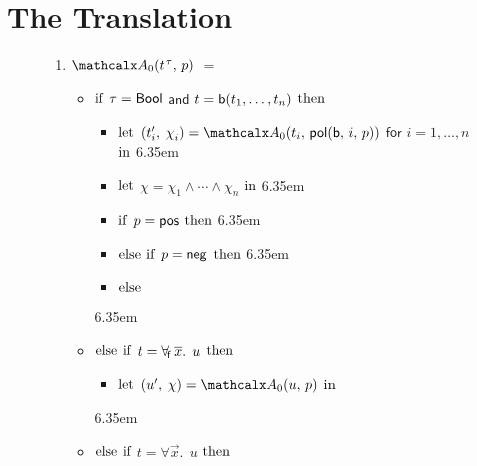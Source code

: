 
\section{The Translation}
\label{sec:encoding}

\newcommand{\itemx}{\itemindent6.35em\item}

\begin{figure}[t]
\normalsize
\begin{enumerate}
\itemx[\ ]
$\conv_0( t\typ{\tau},\, p )$ $=$
 \begin{itemize}
   \itemx[] $\textrm{if}$ $\tau = \mathsf{Bool}$ $\mathsf{and}$ $t = \mathsf{b}(t_1,\dotsc,t_n)$ $\textrm{then}$
    \begin{itemize}
      \itemx[] $\textrm{let}$ $( t'_i,\, \chi_i ) = \conv_0( t_i,\, \pol( \boolop,\, i,\, p ) )$ $\mathsf{for}$ $i = 1, \dotsc, n$ $\textrm{in}$%
      \itemx[] $\textrm{let}$ $\chi = \chi_1 \wedge \cdots \wedge \chi_n$ $\textrm{in}$
      \itemx[] $\textrm{if}$ $p = \mathsf{pos}$ $\textrm{then}$ 
      \itemx[] $\textrm{else}$ $\textrm{if}$ $p = \mathsf{neg}$ $\textrm{then}$ 
      \itemx[] $\textrm{else}$ 
    \end{itemize}
  \itemx[] $\textrm{else}$ $\textrm{if}$ $t = \forall_{\!\mathsf{f}\:} \overline{x}.\;\, u$ $\textrm{then}$
    \begin{itemize}
      \itemx[] $\textrm{let}$ $( u',\, \chi ) = \conv_0( u,\, p )$ $\textrm{in}$ 
    \end{itemize}
  \itemx[] $\textrm{else}$ $\textrm{if}$ $t = \forall \vec x.\;\, u$ $\textrm{then}$
    \begin{itemize}

\end{itemize}
\end{itemize}
\end{enumerate}
\end{figure}
